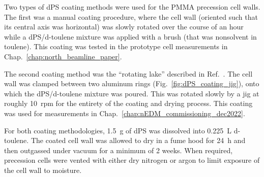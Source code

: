 Two types of dPS coating methods were used for the PMMA precession cell walls. The first was a manual coating procedure, where the cell wall (oriented such that its central axis was horizontal) was slowly rotated over the course of an hour while a dPS/d-toulene mixture was applied with a brush (that was nonsolvent in toulene). This coating was tested in the prototype cell measurements in Chap.~\ref{chap:north_beamline_paper}.

The second coating method was the ``rotating lake'' described in Ref.~\cite{bodek_storage_2008}. The cell wall was clamped between two aluminum rings (Fig.~\ref{fig:dPS_coating_jig}), onto which the dPS/d-toulene mixture was poured. This was rotated slowly by a jig at roughly \qty{10}{rpm} for the entirety of the coating and drying process. This coating was used for measurements in Chap.~\ref{chap:nEDM_commissioning_dec2022}.

For both coating methodologies, \qty{1.5}{\gram} of dPS was dissolved into \qty{0.225}{\liter} d-toulene. The coated cell wall was allowed to dry in a fume hood for \qty{24}{\hour} and then outgassed under vacuum for a minimum of 2 weeks. When required, precession cells were vented with either dry nitrogen or argon to limit exposure of the cell wall to moisture.